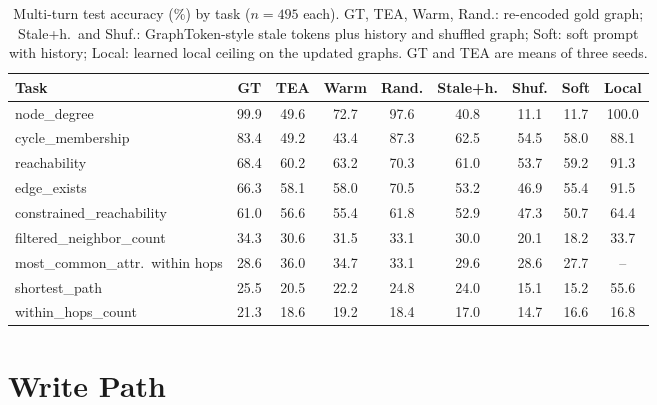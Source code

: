 \documentclass[11pt]{article}
\begin{document}
\begin{table}[t]
\centering
\small
\begin{tabular}{@{}lcccccccc@{}}
\toprule
\textbf{Task} & \textbf{GT} & \textbf{TEA} & \textbf{Warm} & \textbf{Rand.} & \textbf{Stale+h.} & \textbf{Shuf.} & \textbf{Soft} & \textbf{Local} \\
\midrule
node\_degree & 99.9 & 49.6 & 72.7 & 97.6 & 40.8 & 11.1 & 11.7 & 100.0 \\
cycle\_membership & 83.4 & 49.2 & 43.4 & 87.3 & 62.5 & 54.5 & 58.0 & 88.1 \\
reachability & 68.4 & 60.2 & 63.2 & 70.3 & 61.0 & 53.7 & 59.2 & 91.3 \\
edge\_exists & 66.3 & 58.1 & 58.0 & 70.5 & 53.2 & 46.9 & 55.4 & 91.5 \\
constrained\_reachability & 61.0 & 56.6 & 55.4 & 61.8 & 52.9 & 47.3 & 50.7 & 64.4 \\
filtered\_neighbor\_count & 34.3 & 30.6 & 31.5 & 33.1 & 30.0 & 20.1 & 18.2 & 33.7 \\
most\_common\_attr.\ within hops & 28.6 & 36.0 & 34.7 & 33.1 & 29.6 & 28.6 & 27.7 & -- \\
shortest\_path & 25.5 & 20.5 & 22.2 & 24.8 & 24.0 & 15.1 & 15.2 & 55.6 \\
within\_hops\_count & 21.3 & 18.6 & 19.2 & 18.4 & 17.0 & 14.7 & 16.6 & 16.8 \\
\bottomrule
\end{tabular}
\caption{Multi-turn test accuracy (\%) by task ($n{=}495$ each). GT, TEA, Warm, Rand.: re-encoded gold graph; Stale+h.\ and Shuf.: GraphToken-style stale tokens plus history and shuffled graph; Soft: soft prompt with history; Local: learned local ceiling on the updated graphs. GT and TEA are means of three seeds.}
\label{tab:pertask}
\end{table}

\section{Write Path}
\label{app:write}
\end{document}
